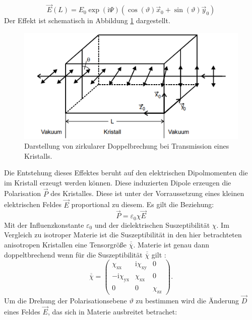 \begin{equation*}
  \vec{E}(L)=E_\mathrm{0} \exp(\mathrm{i}\Psi)\left(\cos(\vartheta) \vec{x}_\mathrm{0} + \sin(\vartheta)\vec{y}_\mathrm{0}\right)
\end{equation*}
Der Effekt ist schematisch in Abbildung \ref{fig:brechung} dargestellt.
\begin{figure}[h]
  \centering
  \includegraphics[scale=0.7]{fig/brechung.png}
  \caption{Darstellung von zirkularer Doppelbrechung bei Transmission eines Kristalls. \cite[1]{Anleitung}}
  \label{fig:brechung}
\end{figure}
Die Entstehung dieses Effektes beruht auf den elektrischen Dipolmomenten die im Kristall erzeugt werden können. Diese induzierten Dipole erzeugen die Polarisation $\vec{P}$ des Kristalles. Diese ist unter der Vorraussetzung eines kleinen elektrischen Feldes $\vec{E}$ proportional zu diesem. Es gilt die Beziehung:
\begin{equation}
  \vec{P}=\varepsilon_\mathrm{0} \chi \vec{E}
\end{equation}
Mit der Influenzkonstante $\varepsilon_\mathrm{0}$ und der dielektrischen Suszeptibilität $\chi$. Im Vergleich zu isotroper Materie ist die Suszeptibilität in den hier betrachteten anisotropen Kristallen eine Tensorgröße $\overline{\overline{\chi}}$. Materie ist genau dann doppeltbrechend wenn für die Suszeptibilität $\overline{\overline{\chi}}$ gilt \cite[3-5]{Anleitung}:
\begin{equation}
  \label{eqn:chitensor}
  \overline{\overline{\chi}}=\begin{pmatrix} \chi_\mathrm{xx} & \mathrm{i}\chi_\mathrm{xy} & 0 \\ -\mathrm{i}\chi_\mathrm{yx} & \chi_\mathrm{xx} & 0 \\ 0 & 0 & \chi_\mathrm{zz} \end{pmatrix}.
\end{equation}
Um die Drehung der Polarisationsebene $\vartheta$ zu bestimmen wird die Änderung $\vec{D}$ eines Feldes $\vec{E}$, das sich in Materie ausbreitet betrachet:

